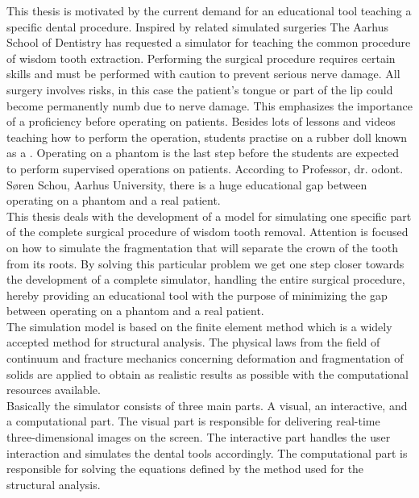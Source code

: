 
This thesis is motivated by the current demand for an educational tool
teaching a specific dental procedure. Inspired by related
simulated surgeries The Aarhus School of Dentistry has requested a
simulator for teaching the common procedure of wisdom tooth
extraction. Performing the surgical procedure requires certain skills
and must be
performed with caution to prevent serious nerve damage. All
surgery involves risks, in this case the patient's tongue or part of
the lip could become permanently numb due to nerve damage. This
emphasizes the importance of a proficiency before
operating on patients. Besides lots of lessons and videos teaching how
to perform the operation, students practise on a rubber doll known
as a . Operating on a phantom is the last step before the
students are expected to perform supervised operations on
patients. According to Professor, dr. odont. Søren Schou, Aarhus
University, there is a huge educational gap between operating on a
phantom and a real patient. \\

This thesis deals with the development of a model for simulating one
specific part of the complete surgical procedure of wisdom tooth
removal.
%
Attention is focused on how to simulate the fragmentation
that will separate the crown of the tooth from its roots. 
By solving this particular problem we get one step closer
towards the development of a complete simulator, handling the entire surgical
procedure, hereby providing an educational tool
with the purpose of minimizing the gap between operating on a phantom
and a real patient. \\

The simulation model
is based on the finite element method which is a widely accepted
method for structural analysis. The physical laws from the field of
continuum and fracture mechanics concerning deformation and
fragmentation of solids are applied to obtain as realistic
results as possible with the computational resources available. \\

Basically the simulator consists of three main parts. A visual,
an interactive, and a computational part. The visual part is
responsible for delivering real-time three-dimensional images on the
screen. The interactive part handles the user interaction and
simulates the dental tools accordingly. The computational part 
is responsible for solving the equations defined by the method used
for the structural analysis. \\

